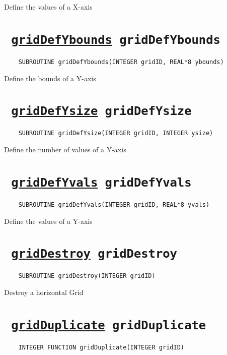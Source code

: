 Define the values of a X-axis
\ifpdfoutput{}{(\ref{gridDefXvals})}


\section*{\texttt{ 
\ifpdf
\hyperref[gridDefYbounds]{gridDefYbounds}
\else
gridDefYbounds
\fi
}}
\begin{verbatim}
    SUBROUTINE gridDefYbounds(INTEGER gridID, REAL*8 ybounds)
\end{verbatim}

Define the bounds of a Y-axis
\ifpdfoutput{}{(\ref{gridDefYbounds})}


\section*{\texttt{ 
\ifpdf
\hyperref[gridDefYsize]{gridDefYsize}
\else
gridDefYsize
\fi
}}
\begin{verbatim}
    SUBROUTINE gridDefYsize(INTEGER gridID, INTEGER ysize)
\end{verbatim}

Define the number of values of a Y-axis
\ifpdfoutput{}{(\ref{gridDefYsize})}


\section*{\texttt{ 
\ifpdf
\hyperref[gridDefYvals]{gridDefYvals}
\else
gridDefYvals
\fi
}}
\begin{verbatim}
    SUBROUTINE gridDefYvals(INTEGER gridID, REAL*8 yvals)
\end{verbatim}

Define the values of a Y-axis
\ifpdfoutput{}{(\ref{gridDefYvals})}


\section*{\texttt{ 
\ifpdf
\hyperref[gridDestroy]{gridDestroy}
\else
gridDestroy
\fi
}}
\begin{verbatim}
    SUBROUTINE gridDestroy(INTEGER gridID)
\end{verbatim}

Destroy a horizontal Grid
\ifpdfoutput{}{(\ref{gridDestroy})}


\section*{\texttt{ 
\ifpdf
\hyperref[gridDuplicate]{gridDuplicate}
\else
gridDuplicate
\fi
}}
\begin{verbatim}
    INTEGER FUNCTION gridDuplicate(INTEGER gridID)
\end{verbatim}


